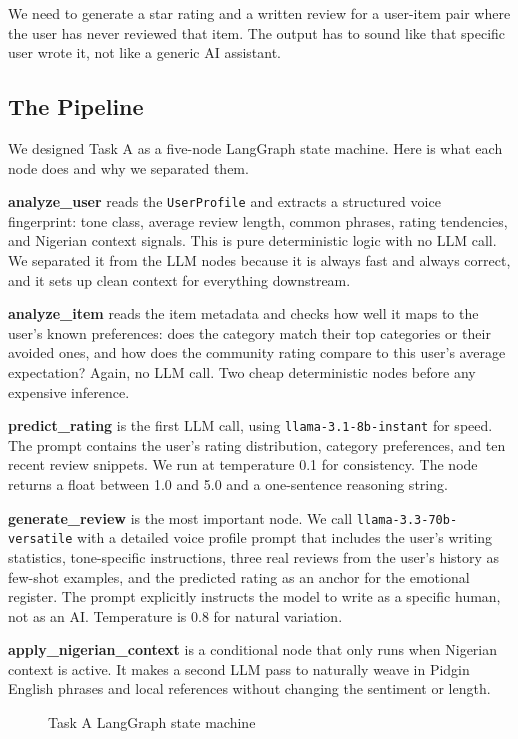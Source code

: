 \documentclass[11pt,a4paper]{article}
\begin{document}
We need to generate a star rating and a written review for a user-item
pair where the user has never reviewed that item. The output has to sound
like that specific user wrote it, not like a generic AI assistant.

\subsection{The Pipeline}

We designed Task A as a five-node LangGraph state machine. Here is what
each node does and why we separated them.

\textbf{analyze\_user} reads the \texttt{UserProfile} and extracts a
structured voice fingerprint: tone class, average review length, common
phrases, rating tendencies, and Nigerian context signals. This is pure
deterministic logic with no LLM call. We separated it from the LLM nodes
because it is always fast and always correct, and it sets up clean context
for everything downstream.

\textbf{analyze\_item} reads the item metadata and checks how well it maps
to the user's known preferences: does the category match their top
categories or their avoided ones, and how does the community rating compare
to this user's average expectation? Again, no LLM call. Two cheap
deterministic nodes before any expensive inference.

\textbf{predict\_rating} is the first LLM call, using
\texttt{llama-3.1-8b-instant} for speed. The prompt contains the user's
rating distribution, category preferences, and ten recent review snippets.
We run at temperature 0.1 for consistency. The node returns a float between
1.0 and 5.0 and a one-sentence reasoning string.

\textbf{generate\_review} is the most important node. We call
\texttt{llama-3.3-70b-versatile} with a detailed voice profile prompt that
includes the user's writing statistics, tone-specific instructions, three
real reviews from the user's history as few-shot examples, and the
predicted rating as an anchor for the emotional register. The prompt
explicitly instructs the model to write as a specific human, not as an AI.
Temperature is 0.8 for natural variation.

\textbf{apply\_nigerian\_context} is a conditional node that only runs when
Nigerian context is active. It makes a second LLM pass to naturally weave
in Pidgin English phrases and local references without changing the
sentiment or length.

\begin{figure}[h]
\centering
\caption{Task A LangGraph state machine}
\label{fig:task_a}
\end{figure}
\end{document}
